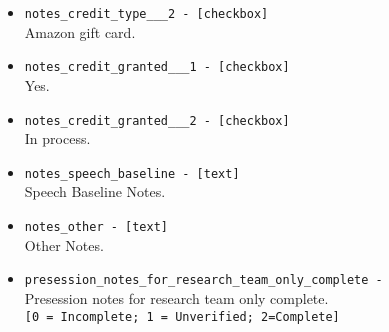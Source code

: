 \begin{description}
\begin{addmargin}[0em]{0em}
\begin{addmargin}[1em]{0em}
\begin{itemize}
            \item \verb|notes_credit_type___2 - [checkbox]|\\Amazon gift card.
            \item \verb|notes_credit_granted___1 - [checkbox]|\\Yes.
            \item \verb|notes_credit_granted___2 - [checkbox]|\\In process.
            \item \verb|notes_speech_baseline - [text]|\\Speech Baseline Notes.
            \item \verb|notes_other - [text]|\\Other Notes.
            \item \verb|presession_notes_for_research_team_only_complete - |\\Presession notes for research team only complete.\\\verb|[0 = Incomplete; 1 = Unverified; 2=Complete]|\\
            

\end{itemize}
\end{addmargin}
\end{addmargin}
\end{description}
